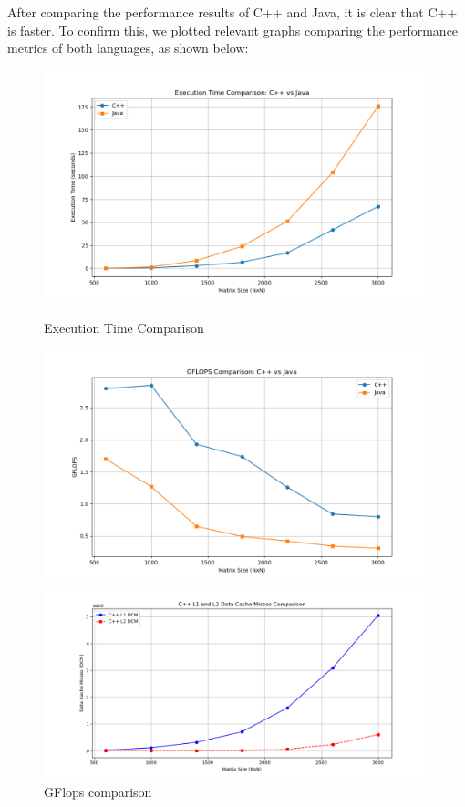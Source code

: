 \documentclass{article}
\begin{document}
After comparing the performance results of C++ and Java, it is clear that C++ is faster. To confirm this, we plotted relevant graphs comparing the performance metrics of both languages, as shown below:

\begin{figure}[H]
    \centering
    \begin{minipage}{0.32\textwidth}
        \centering
        \includegraphics[width=\textwidth]{Figure_1.png}
        \caption{\small Execution Time Comparison}
        \label{fig:execution_time}
    \end{minipage}
    \hfill
    \begin{minipage}{0.32\textwidth}
        \centering
        \includegraphics[width=\textwidth]{Figure_2.png}
        \caption{\small GFlops comparison}
        \label{fig:flops}
    \end{minipage}
    \hfill
    \begin{minipage}{0.32\textwidth}
        \centering
        \includegraphics[width=\textwidth]{Figure_3.png}

\end{minipage}
\end{figure}
\end{document}
